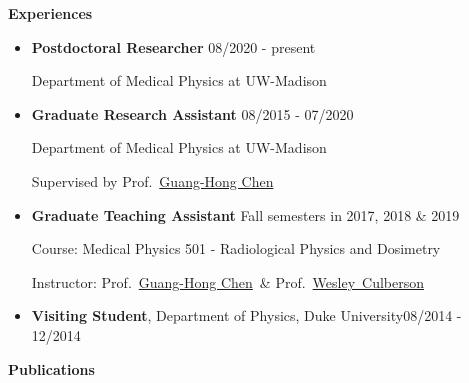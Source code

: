 \documentclass[letterpaper,11pt]{article}
\newcommand{\resheading}[1]{{\large \colorbox{mygrey}{\begin{minipage}{\textwidth}{\textbf{#1 \vphantom{p\^{E}}}}\end{minipage}}}}
\newcommand{\profchen}{Prof.~\href{https://www.medphysics.wisc.edu/blog/staff/chen-guanghong/} {Guang-Hong Chen}}
\newcommand{\profculberson}{Prof.~\href{https://www.medphysics.wisc.edu/blog/staff/culberson-wesley/} {Wesley~Culberson}}
\begin{document}
\resheading{Experiences}
\begin{itemize}
\item \textbf{Postdoctoral Researcher}\cftdotfill{\cftdotsep} 08/2020 - present

Department of Medical Physics at UW-Madison

\item \textbf{Graduate Research Assistant}\cftdotfill{\cftdotsep} 08/2015 - 07/2020

Department of Medical Physics at UW-Madison

Supervised by \profchen
\item \textbf{Graduate Teaching Assistant} \cftdotfill{\cftdotsep} Fall semesters in 2017,  2018 \& 2019

Course: Medical Physics 501 - Radiological Physics and Dosimetry

Instructor: \profchen~\& \profculberson
	 \item \textbf{Visiting Student}, Department of Physics, Duke University\cftdotfill{\cftdotsep}08/2014 - 12/2014
\end{itemize}
\resheading{Publications}
\end{document}
